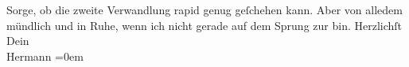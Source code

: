 \begin{ledgroupsized}[t]{13cm}
               Sorge, ob die zweite Verwandlung rapid genug geſchehen kann. Aber von alledem
               mündlich und \introOben{}in\introOben{} Ruhe, wenn ich nicht gerade auf dem Sprung
               zur \label{K_L01172_2v}\label{K_L01172_2h} bin.\pend
           \pstart
           Herzlichſt{\\[\baselineskip]}Dein{\\[\baselineskip]}\spacefill\mbox{Hermann}\pend
           \leftskip=0em{}\endnumbering{}\end{ledgroupsized}  \newcommand{\dateiname}{L01172}\newcommand{\titel}{Hermann Bahr an Arthur Schnitzler, 12. 9. 1901}\newcommand{\editorInnen}{ Kurt Ifkovits,  Martin Anton Müller}
      
